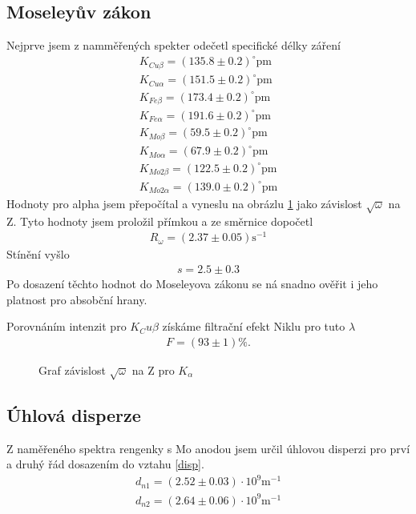 \documentclass[a4paper,12pt]{article}
\begin{document}
\subsection{Moseleyův zákon}
Nejprve jsem z namměřených spekter odečetl specifické délky záření
\begin{eqnarray}
K_{Cu\beta}=(135.8 \pm 0.2)^{\circ} \mbox{pm}\\
K_{Cu\alpha}=(151.5 \pm 0.2)^{\circ} \mbox{pm}\\
K_{Fe\beta}=(173.4 \pm 0.2)^{\circ} \mbox{pm}\\
K_{Fe\alpha}=(191.6 \pm 0.2)^{\circ} \mbox{pm}\\
K_{Mo\beta}=(59.5 \pm 0.2)^{\circ} \mbox{pm}\\
K_{Mo\alpha}=(67.9 \pm 0.2)^{\circ} \mbox{pm}\\
K_{Mo2\beta}=(122.5 \pm 0.2)^{\circ} \mbox{pm}\\
K_{Mo2\alpha}=(139.0 \pm 0.2)^{\circ} \mbox{pm}
\end{eqnarray}
Hodnoty pro alpha jsem přepočítal a vyneslu na obrázlu \ref{kal} jako závislost $\sqrt{\omega}$ na Z. Tyto hodnoty jsem proložil přímkou a ze směrnice dopočetl
\begin{eqnarray}
R_\omega=(2.37\pm0.05) \mbox{s}^{-1}
\end{eqnarray}
Stínění vyšlo
\begin{eqnarray}
s=2.5\pm0.3
\end{eqnarray}
Po dosazení těchto hodnot do Moseleyova zákonu se ná snadno ověřit i jeho platnost pro absobční hrany.

Porovnáním intenzit pro $K_Cu\beta$ získáme filtrační efekt Niklu pro tuto $\lambda$
\begin{eqnarray}
F=(93 \pm 1)\%.
\end{eqnarray}

\begin{figure}
\begin{center}

\end{center}
\caption{Graf závislost $\sqrt{\omega}$ na Z pro $K_\alpha$}
\label{kal}
\end{figure}

\subsection{Úhlová disperze}
Z naměřeného spektra rengenky s Mo anodou jsem určil úhlovou disperzi pro prví a druhý řád dosazením do vztahu \ref{disp}.
\begin{eqnarray}
d_{n1}=(2.52 \pm 0.03)\cdot 10^9 \mbox{m}^{-1}\\
d_{n2}=(2.64 \pm 0.06)\cdot 10^9 \mbox{m}^{-1}
\end{eqnarray}
\end{document}
